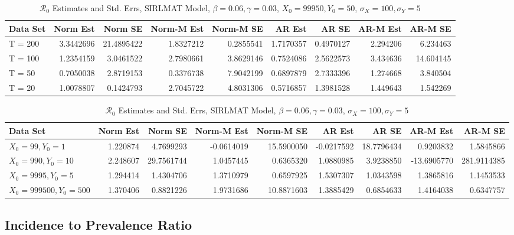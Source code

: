 \documentclass[12pt]{article}
\newcommand{\rr}{\ensuremath{\mathcal{R}_0}}
\begin{document}
\begin{table}[H]
	
	\caption{\label{tab:}$\rr$ Estimates and Std. Errs, SIRLMAT Model,
		$\beta = 0.06, \gamma = 0.03$, $X_0 = 99950, Y_0 = 50$, $\sigma_X = 100, \sigma_Y = 5$}
	\centering
	\begin{tabular}[t]{l|r|r|r|r|r|r|r|r}
		\hline
		Data Set & Norm Est & Norm SE & Norm-M Est & Norm-M SE & AR Est & AR SE & AR-M Est & AR-M SE\\
		\hline
		T = 200 & 3.3442696 & 21.4895422 & 1.8327212 & 0.2855541 & 1.7170357 & 0.4970127 & 2.294206 & 6.234463\\
		\hline
		T = 100 & 1.2354159 & 3.0461522 & 2.7980661 & 3.8629146 & 0.7524086 & 2.5622573 & 3.434636 & 14.604145\\
		\hline
		T = 50 & 0.7050038 & 2.8719153 & 0.3376738 & 7.9042199 & 0.6897879 & 2.7333396 & 1.274668 & 3.840504\\
		\hline
		T = 20 & 1.0078807 & 0.1424793 & 2.7045722 & 4.8031306 & 0.5716857 & 1.3981528 & 1.449643 & 1.542269\\
		\hline
	\end{tabular}
\end{table}

\begin{table}[H]
	
	\caption{\label{tab:}$\rr$ Estimates and Std. Errs, SIRLMAT Model,
		$\beta = 0.06, \gamma = 0.03$, $\sigma_X = 100, \sigma_Y = 5$}
	\centering
	\begin{tabular}[t]{l|r|r|r|r|r|r|r|r}
		\hline
		Data Set & Norm Est & Norm SE & Norm-M Est & Norm-M SE & AR Est & AR SE & AR-M Est & AR-M SE\\
		\hline
		$X_0 = 99, Y_0 = 1$ & 1.220874 & 4.7699293 & -0.0614019 & 15.5900050 & -0.0217592 & 18.7796434 & 0.9203832 & 1.5845866\\
		\hline
		$X_0 = 990, Y_0 = 10$ & 2.248607 & 29.7561744 & 1.0457445 & 0.6365320 & 1.0880985 & 3.9238850 & -13.6905770 & 281.9114385\\
		\hline
		$X_0 = 9995, Y_0 = 5$ & 1.294414 & 1.4304706 & 1.3710979 & 0.6597925 & 1.5307307 & 1.0343598 & 1.3865816 & 1.1453533\\
		\hline
		$X_0 = 999500, Y_0 = 500$ & 1.370406 & 0.8821226 & 1.9731686 & 10.8871603 & 1.3885429 & 0.6854633 & 1.4164038 & 0.6347757\\
		\hline
	\end{tabular}
\end{table}

\subsection{Incidence to Prevalence Ratio}
\end{document}
